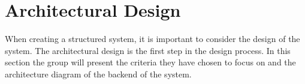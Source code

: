 \section{Architectural Design}\label{sec:architectural-design}

When creating a structured system, it is important to consider the design of the system.
The architectural design is the first step in the design process.
In this section the group will present the criteria they have chosen to focus on and the architecture diagram of the
backend of the system.




